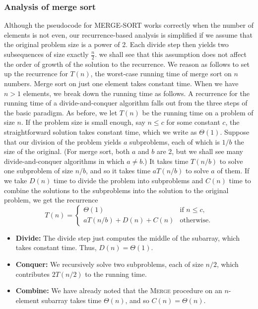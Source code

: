 \documentclass{report}
\begin{document}
        \subsubsection{Analysis of merge sort}
        \bigbreak \noindent 
        Although the pseudocode for MERGE-SORT works correctly when the number of elements is not even, our recurrence-based analysis is simplified if we assume that the original problem size is a power of 2. Each divide step then yields two subsequences of size exactly $\frac{n}{2}$. we shall see that this assumption does not affect the order of growth of the solution to the recurrence.
        \bigbreak \noindent 
        We reason as follows to set up the recurrence for $T(n)$, the worst-case running time of merge sort on $n$ numbers. Merge sort on just one element takes constant time. When we have $n>1$ elements, we break down the running time as follows.
        \bigbreak \noindent 
        A recurrence for the running time of a divide-and-conquer algorithm falls out 
        from the three steps of the basic paradigm. As before, we let $T(n)$ be the running 
        time on a problem of size $n$. If the problem size is small enough, say $n \leq c$ 
        for some constant $c$, the straightforward solution takes constant time, which we 
        write as $\Theta(1)$. Suppose that our division of the problem yields $a$ subproblems, 
        each of which is $1/b$ the size of the original. (For merge sort, both $a$ and $b$ are 2, 
        but we shall see many divide-and-conquer algorithms in which $a \neq b$.) It takes 
        time $T(n/b)$ to solve one subproblem of size $n/b$, and so it takes time $aT(n/b)$ 
        to solve $a$ of them. If we take $D(n)$ time to divide the problem into subproblems 
        and $C(n)$ time to combine the solutions to the subproblems into the solution to the 
        original problem, we get the recurrence
        \[
            T(n) =
            \begin{cases}
                \Theta(1) & \text{if } n \leq c , \\
                aT(n/b) + D(n) + C(n) & \text{otherwise} .
            \end{cases}
        \]
        \bigbreak \noindent 
        \begin{itemize}
            \item \textbf{Divide:} The divide step just computes the middle of the subarray, which takes constant time. Thus, $D(n) = \Theta(1)$.
            \item \textbf{Conquer:} We recursively solve two subproblems, each of size $n/2$, which contributes $2T(n/2)$ to the running time.
            \item \textbf{Combine:} We have already noted that the \textsc{Merge} procedure on an $n$-element subarray takes time $\Theta(n)$, and so $C(n) = \Theta(n)$.
        \end{itemize}
\end{document}
